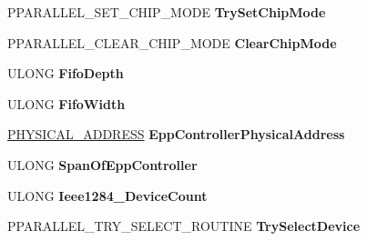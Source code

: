 \begin{DoxyCompactItemize}
P\+P\+A\+R\+A\+L\+L\+E\+L\+\_\+\+S\+E\+T\+\_\+\+C\+H\+I\+P\+\_\+\+M\+O\+DE {\bfseries Try\+Set\+Chip\+Mode}
\item 
\mbox{\label{struct___p_a_r_a_l_l_e_l___p_n_p___i_n_f_o_r_m_a_t_i_o_n_a32551338675c9a7e1a1c5ece486b7866}} 
P\+P\+A\+R\+A\+L\+L\+E\+L\+\_\+\+C\+L\+E\+A\+R\+\_\+\+C\+H\+I\+P\+\_\+\+M\+O\+DE {\bfseries Clear\+Chip\+Mode}
\item 
\mbox{\label{struct___p_a_r_a_l_l_e_l___p_n_p___i_n_f_o_r_m_a_t_i_o_n_a43bdddbea07af3281822cab0e0365e33}} 
U\+L\+O\+NG {\bfseries Fifo\+Depth}
\item 
\mbox{\label{struct___p_a_r_a_l_l_e_l___p_n_p___i_n_f_o_r_m_a_t_i_o_n_ad895c061c2166944bb87484fd2a3036a}} 
U\+L\+O\+NG {\bfseries Fifo\+Width}
\item 
\mbox{\label{struct___p_a_r_a_l_l_e_l___p_n_p___i_n_f_o_r_m_a_t_i_o_n_ab1957cbac4effa5c42b4c4ef8b6bd4ee}} 
\hyperlink{union___l_a_r_g_e___i_n_t_e_g_e_r}{P\+H\+Y\+S\+I\+C\+A\+L\+\_\+\+A\+D\+D\+R\+E\+SS} {\bfseries Epp\+Controller\+Physical\+Address}
\item 
\mbox{\label{struct___p_a_r_a_l_l_e_l___p_n_p___i_n_f_o_r_m_a_t_i_o_n_ac1f99ca638817e7760ffc238df4826c4}} 
U\+L\+O\+NG {\bfseries Span\+Of\+Epp\+Controller}
\item 
\mbox{\label{struct___p_a_r_a_l_l_e_l___p_n_p___i_n_f_o_r_m_a_t_i_o_n_a01811836514bd35b74d91249bf9d3569}} 
U\+L\+O\+NG {\bfseries Ieee1284\+\_\+Device\+Count}
\item 
\mbox{\label{struct___p_a_r_a_l_l_e_l___p_n_p___i_n_f_o_r_m_a_t_i_o_n_a1f4cec6385d3d4c88b279a308f213260}} 
P\+P\+A\+R\+A\+L\+L\+E\+L\+\_\+\+T\+R\+Y\+\_\+\+S\+E\+L\+E\+C\+T\+\_\+\+R\+O\+U\+T\+I\+NE {\bfseries Try\+Select\+Device}
\item 
\mbox{\label{struct___p_a_r_a_l_l_e_l___p_n_p___i_n_f_o_r_m_a_t_i_o_n_a5d053d27d7f0a87dd3adae27cdebb011}} 

\end{DoxyCompactItemize}
